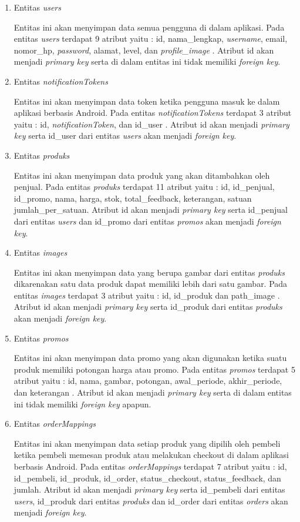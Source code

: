 \begin{enumerate}
	\item Entitas \textit{users}
	\par Entitas ini akan menyimpan data semua pengguna di dalam aplikasi. Pada entitas \textit{users} terdapat 9 atribut yaitu : id, nama\_lengkap, \textit{username}, email, nomor\_hp, \textit{password}, alamat, level, dan \textit{profile\_image} . Atribut id akan menjadi \textit{primary key} serta di dalam entitas ini tidak memiliki \textit{foreign key}.
	\item Entitas \textit{notificationTokens}
	\par Entitas ini akan menyimpan data token ketika pengguna masuk ke dalam aplikasi berbasis Android. Pada entitas \textit{notificationTokens} terdapat 3 atribut yaitu : id, \textit{notificationToken}, dan id\_user . Atribut id akan menjadi \textit{primary key} serta id\_user dari entitas \textit{users} akan menjadi \textit{foreign key}.
	\item Entitas \textit{produks}
	\par Entitas ini akan menyimpan data produk yang akan ditambahkan oleh penjual. Pada entitas \textit{produks} terdapat 11 atribut yaitu : id, id\_penjual, id\_promo, nama, harga, stok, total\_feedback, keterangan, satuan jumlah\_per\_satuan. Atribut id akan menjadi \textit{primary key} serta id\_penjual dari entitas \textit{users} dan id\_promo dari entitas \textit{promos} akan menjadi \textit{foreign key}.
	\item Entitas \textit{images}
	\par Entitas ini akan menyimpan data yang berupa gambar dari entitas \textit{produks} dikarenakan satu data produk dapat memiliki lebih dari satu gambar. Pada entitas \textit{images} terdapat 3 atribut yaitu : id, id\_produk dan path\_image . Atribut id akan menjadi \textit{primary key} serta id\_produk dari entitas \textit{produks} akan menjadi \textit{foreign key}.
	\item Entitas \textit{promos}
	\par Entitas ini akan menyimpan data promo yang akan digunakan ketika suatu produk memiliki potongan harga atau promo. Pada entitas \textit{promos} terdapat 5 atribut yaitu : id, nama, gambar, potongan, awal\_periode, akhir\_periode, dan keterangan . Atribut id akan menjadi \textit{primary key} serta di dalam entitas ini tidak memiliki \textit{foreign key} apapun.
	\newpage
	\item Entitas \textit{orderMappings}
	\par Entitas ini akan menyimpan data setiap produk yang dipilih oleh pembeli ketika pembeli memesan produk atau melakukan checkout di dalam aplikasi berbasis Android. Pada entitas \textit{orderMappings} terdapat 7 atribut yaitu : id, id\_pembeli, id\_produk, id\_order, status\_checkout, status\_feedback, dan jumlah. Atribut id akan menjadi \textit{primary key} serta id\_pembeli dari entitas \textit{users}, id\_produk dari entitas \textit{produks} dan id\_order dari entitas \textit{orders} akan menjadi \textit{foreign key}.

\end{enumerate}
